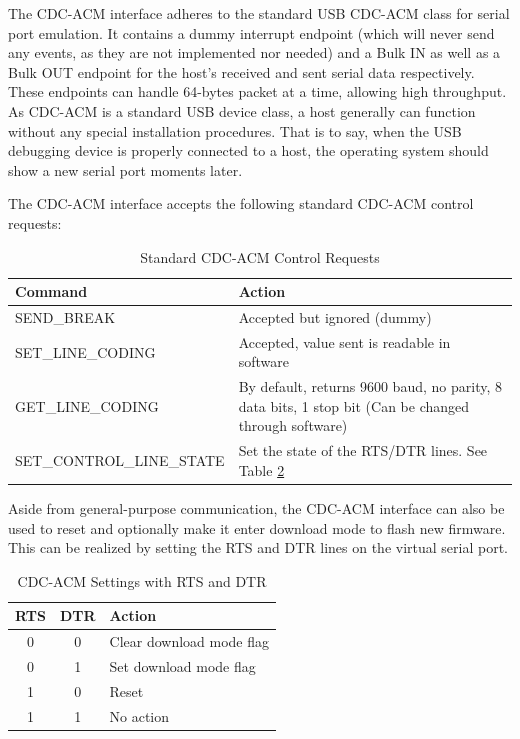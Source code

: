 \documentclass[main\_\_EN.tex]{subfiles}
\begin{document}
The CDC-ACM interface adheres to the standard USB CDC-ACM class for serial port emulation. It contains a dummy interrupt endpoint (which will never send any events, as they are not implemented nor needed) and a Bulk IN as well as a Bulk OUT endpoint for the host's received and sent serial data respectively. These endpoints can handle 64-bytes packet at a time, allowing high throughput. As CDC-ACM is a standard USB device class, a host generally can function without any special installation procedures. That is to say, when the USB debugging device is properly connected to a host, the operating system should show a new serial port moments later.

The CDC-ACM interface accepts the following standard CDC-ACM control requests:

\begin{table}[H]
\centering
\caption{Standard CDC-ACM Control Requests}
\label{tab:usbserialjtag-standard-cdc-acm-requests}

\begin{tabular}{ | l | p{10cm} | }\hline
\rowcolor{lightgray}
\textbf{Command} & \textbf{Action} \\\hline

SEND\_BREAK & Accepted but ignored (dummy) \\\hline
SET\_LINE\_CODING & Accepted, value sent is readable in software \\\hline
GET\_LINE\_CODING & By default, returns 9600 baud, no parity, 8 data bits, 1 stop bit (Can be changed through software) \\\hline
SET\_CONTROL\_LINE\_STATE & Set the state of the RTS/DTR lines. See Table \ref{tab:usbserialjtag-cdc-acm-settings-with-rts-and-dtr} \\\hline
\end{tabular}
\end{table}

Aside from general-purpose communication, the CDC-ACM interface can also be used to reset \chipname{} and optionally make it enter download mode to flash new firmware. This can be realized by setting the RTS and DTR lines on the virtual serial port.

\begin{table}[H]
\centering
\caption{CDC-ACM Settings with RTS and DTR}
\label{tab:usbserialjtag-cdc-acm-settings-with-rts-and-dtr}

\begin{tabular}{ | c | c | p{5cm} | }\hline
\rowcolor{lightgray}
\textbf{RTS} & \textbf{DTR} & \textbf{Action}\\\hline

0 & 0 & Clear download mode flag  \\\hline
0 & 1 & Set download mode flag  \\\hline
1 & 0 & Reset \chipname{}  \\\hline
1 & 1 & No action \\\hline
\end{tabular}
\end{table}
\end{document}
